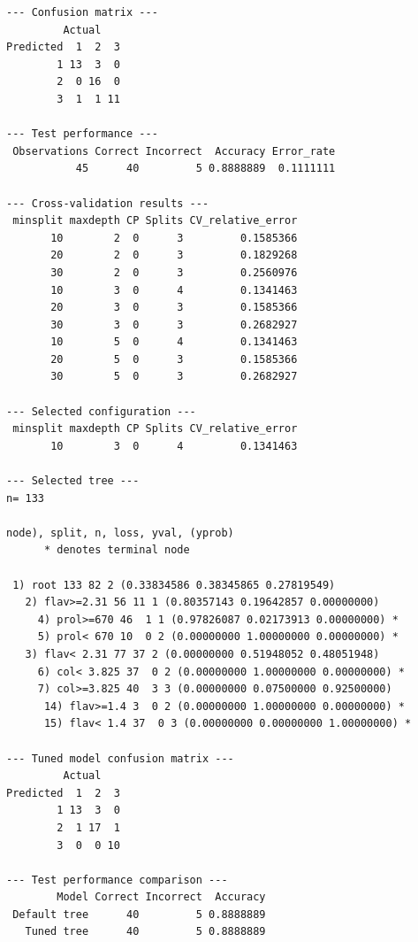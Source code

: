 \documentclass[11pt,a4paper]{article}
\begin{document}
\begin{lstlisting}[style=console]
--- Confusion matrix ---
         Actual
Predicted  1  2  3
        1 13  3  0
        2  0 16  0
        3  1  1 11

--- Test performance ---
 Observations Correct Incorrect  Accuracy Error_rate
           45      40         5 0.8888889  0.1111111

--- Cross-validation results ---
 minsplit maxdepth CP Splits CV_relative_error
       10        2  0      3         0.1585366
       20        2  0      3         0.1829268
       30        2  0      3         0.2560976
       10        3  0      4         0.1341463
       20        3  0      3         0.1585366
       30        3  0      3         0.2682927
       10        5  0      4         0.1341463
       20        5  0      3         0.1585366
       30        5  0      3         0.2682927

--- Selected configuration ---
 minsplit maxdepth CP Splits CV_relative_error
       10        3  0      4         0.1341463

--- Selected tree ---
n= 133 

node), split, n, loss, yval, (yprob)
      * denotes terminal node

 1) root 133 82 2 (0.33834586 0.38345865 0.27819549)  
   2) flav>=2.31 56 11 1 (0.80357143 0.19642857 0.00000000)  
     4) prol>=670 46  1 1 (0.97826087 0.02173913 0.00000000) *
     5) prol< 670 10  0 2 (0.00000000 1.00000000 0.00000000) *
   3) flav< 2.31 77 37 2 (0.00000000 0.51948052 0.48051948)  
     6) col< 3.825 37  0 2 (0.00000000 1.00000000 0.00000000) *
     7) col>=3.825 40  3 3 (0.00000000 0.07500000 0.92500000)  
      14) flav>=1.4 3  0 2 (0.00000000 1.00000000 0.00000000) *
      15) flav< 1.4 37  0 3 (0.00000000 0.00000000 1.00000000) *

--- Tuned model confusion matrix ---
         Actual
Predicted  1  2  3
        1 13  3  0
        2  1 17  1
        3  0  0 10

--- Test performance comparison ---
        Model Correct Incorrect  Accuracy
 Default tree      40         5 0.8888889
   Tuned tree      40         5 0.8888889
\end{lstlisting}
\end{document}
